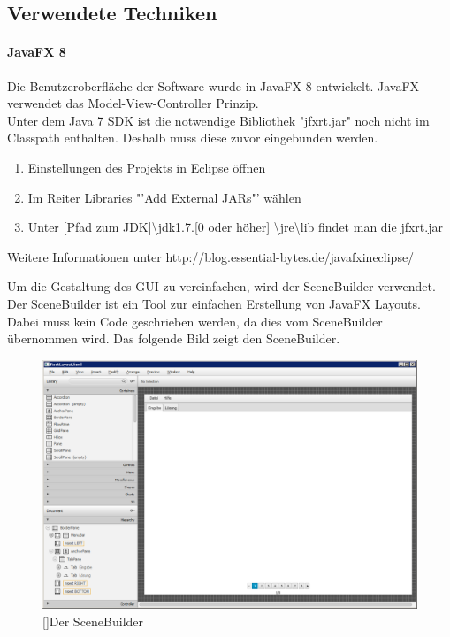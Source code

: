 \documentclass[12pt,a4paper, listof=entryprefix, bibliography=totocnumbered,toc=listofnumbered,lof=listofnumbered]{scrartcl}
\begin{document}
\subsection{Verwendete Techniken}
\paragraph{JavaFX 8}
Die Benutzeroberfläche der Software wurde in JavaFX 8 entwickelt. JavaFX verwendet das Model-View-Controller Prinzip.
\\
Unter dem Java 7 SDK ist die notwendige Bibliothek "jfxrt.jar" noch nicht im Classpath enthalten. Deshalb muss diese zuvor eingebunden werden.

\begin{enumerate}
	\item Einstellungen des Projekts in Eclipse öffnen
	\item Im Reiter Libraries "'Add External JARs"' wählen
	\item Unter [Pfad zum JDK]\textbackslash jdk1.7.[0 oder höher]  \textbackslash jre\textbackslash lib findet man die jfxrt.jar
\end{enumerate}
Weitere Informationen unter http://blog.essential-bytes.de/javafx\textunderscore in\textunderscore eclipse/

Um die Gestaltung des \gls{GUI} zu vereinfachen, wird der SceneBuilder verwendet. Der SceneBuilder ist ein Tool zur einfachen Erstellung von JavaFX Layouts. Dabei muss kein Code geschrieben werden, da dies vom SceneBuilder übernommen wird. Das folgende Bild zeigt den SceneBuilder.

\begin{figure}[H]
	\centering
	\includegraphics[width=1.0\linewidth]{images/scenebuilder.png} 
	[]{Der SceneBuilder}
	\label{fig:scenebuilder}
\end{figure}
\end{document}
